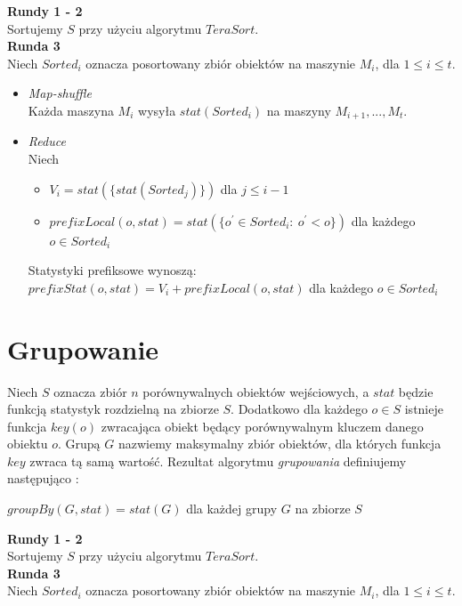 \documentclass{pracamgr}
\begin{document}
\textbf{Rundy 1 - 2} \\
Sortujemy \(S\) przy użyciu algorytmu \(TeraSort\). \\

\textbf{Runda 3} \\
Niech \(Sorted_i\) oznacza posortowany zbiór obiektów na maszynie \(M_i\), dla \(1 \leq i \leq t\).
\begin{itemize}
    \item \textit{Map-shuffle} \\
    Każda maszyna \(M_i\) wysyła \(stat(Sorted_i)\) na maszyny \(M_{i+1}, ..., M_t\).
    \item \textit{Reduce} \\
    Niech
    \begin{itemize}
        \item \(V_i = stat(\{stat(Sorted_j)\})\) dla \(j \leq i-1\)
        \item \(prefixLocal(o, stat) = stat(\{o^\prime \in Sorted_i: \ o^\prime < o \})\) dla każdego \(o \in Sorted_i\)
    \end{itemize}
    Statystyki prefiksowe wynoszą: \\
    
    \centering
    \(prefixStat(o, stat) = V_i + prefixLocal(o, stat)\) dla każdego \(o \in Sorted_i\)
\end{itemize}

\section{Grupowanie}
Niech \(S\) oznacza zbiór \(n\) porównywalnych obiektów wejściowych, a \(stat\) będzie funkcją statystyk rozdzielną na zbiorze \(S\). Dodatkowo dla każdego \(o \in S\) istnieje funkcja \(key(o)\) zwracająca obiekt będący porównywalnym kluczem danego obiektu \(o\). Grupą \(G\) nazwiemy maksymalny zbiór obiektów, dla których funkcja \(key\) zwraca tą samą wartość. Rezultat algorytmu \textit{grupowania} definiujemy następująco \cite{tao2013minimal}:
\begin{center}
\(groupBy(G, stat) = stat(G)\) dla każdej grupy \(G\) na zbiorze \(S\) \\
\end{center}

\textbf{Rundy 1 - 2} \\
Sortujemy \(S\) przy użyciu algorytmu \(TeraSort\). \\

\textbf{Runda 3} \\
Niech \(Sorted_i\) oznacza posortowany zbiór obiektów na maszynie \(M_i\), dla \(1 \leq i \leq t\).
\end{document}
